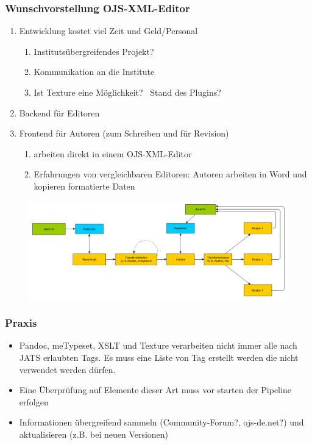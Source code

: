 \documentclass{article}
\begin{document}
\subsubsection{Wunschvorstellung OJS-XML-Editor}
\begin{enumerate}
\item Entwicklung kostet viel Zeit und Geld/Personal
\begin{enumerate}
\item Institutsübergreifendes Projekt?
\item Kommunikation an die Institute
\item Ist Texture eine Möglichkeit? \textrightarrow\ Stand des Plugins? 
\end{enumerate}
\item Backend für Editoren
\item Frontend für Autoren (zum Schreiben und für Revision)
\begin{enumerate}
\item arbeiten direkt in einem OJS-XML-Editor
\item Erfahrungen von vergleichbaren Editoren: Autoren arbeiten in Word und kopieren formatierte Daten
\end{enumerate}
\end{enumerate}
\begin{figure}[htbp]
\includegraphics[width=\textwidth]{resource2.png}
\end{figure}

\subsubsection{Praxis}
\begin{itemize}
\item Pandoc, meTypeset, XSLT und Texture verarbeiten nicht immer alle nach JATS erlaubten Tags. Es muss eine Liste von Tag erstellt werden die nicht verwendet werden dürfen.
\item Eine Überprüfung auf Elemente dieser Art muss vor starten der Pipeline erfolgen
\item Informationen übergreifend sammeln (Community-Forum?, ojs-de.net?) und aktualisieren (z.B. bei neuen Versionen) 
\end{itemize}
\end{document}
